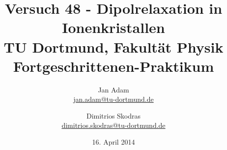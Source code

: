 

\usepackage{multirow}
\usepackage{epstopdf}


\title{Versuch 48 - Dipolrelaxation in Ionenkristallen\\				%
\large TU Dortmund, Fakultät Physik\\ 
\normalsize Fortgeschrittenen-Praktikum}

\author{Jan Adam\\			%
{\small \href{jan.adam@tu-dortmund.de}{jan.adam@tu-dortmund.de}}	%
\and						%
Dimitrios Skodras\\					%
{\small \href{dimitrios.skodras@tu-dortmund.de}{dimitrios.skodras@tu-dortmund.de}}		%
}
\date{16. April 2014}				%





\maketitle					%
\thispagestyle{empty} 				%



\tableofcontents


\newpage					%


